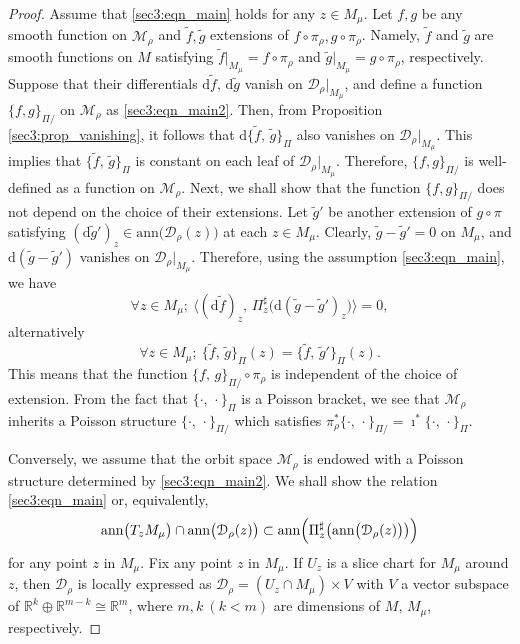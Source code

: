 \documentclass[a4paper,11pt,dvipdfmx]{article}
\numberwithin{equation}{section}
\begin{document}
\begin{proof}
Assume that \eqref{sec3:eqn_main} holds for any $z\in M_{\mu}$. Let $f,g$ be any smooth function on $\mathcal{M}_{\rho}$ 
and $\tilde{f}, \tilde{g}$ extensions of $f\circ\pi_{\rho}, g\circ\pi_{\rho}$. 
Namely, $\tilde{f}$ and $\tilde{g}$ are smooth functions on $M$ satisfying $\tilde{f}|_{M_{\mu}}=f\circ\pi_{\rho}$ and $\tilde{g}|_{M_{\mu}}=g\circ\pi_{\rho}$, respectively. 
Suppose that their differentials $\mathrm{d}\tilde{f},\,\mathrm{d}\tilde{g}$ vanish on $\mathcal{D}_{\rho}|_{M_{\mu}}$, and 
define a function $\{f,g\}_{\Pi/}$ on $\mathcal{M}_{\rho}$ as \eqref{sec3:eqn_main2}. 
Then, from Proposition \ref{sec3:prop_vanishing}, it follows that $\mathrm{d}\{\tilde{f},\,\tilde{g}\}_{\Pi}$ also vanishes on $\mathcal{D}_{\rho}|_{M_{\mu}}$. 
This implies that $\{\tilde{f},\,\tilde{g}\}_{\Pi}$ is constant on each leaf of $\mathcal{D}_{\rho}|_{M_{\mu}}$. Therefore, $\{f,g\}_{\Pi/}$ is well-defined as a function on $\mathcal{M}_{\rho}$. 
Next, we shall show that the function $\{f,g\}_{\Pi/}$ does not depend on the choice of their extensions. 
Let $\tilde{g}'$ be another extension of $g\circ\pi$ satisfying $(\mathrm{d}\tilde{g}')_z\in \mathrm{ann}\bigl(\mathcal{D}_{\rho}(z)\bigr)$ at each $z\in M_{\mu}$. 
Clearly, $\tilde{g}-\tilde{g}'=0$ on $M_{\mu}$, and $\mathrm{d}(\tilde{g}-\tilde{g}')$ vanishes on $\mathcal{D}_{\rho}|_{M_{\mu}}$. 
Therefore, using the assumption \eqref{sec3:eqn_main}, we have 
\[
\forall z\in M_{\mu};\ \bigl\langle (\mathrm{d}\tilde{f})_z,\, \Pi^{\sharp}_z\bigl(\mathrm{d}(\tilde{g}-\tilde{g}')_z\bigr)\bigr\rangle = 0, 
\]
alternatively 
\[
\forall z\in M_{\mu};\ \{\tilde{f},\,\tilde{g}\}_{\Pi}(z) = \{\tilde{f},\,\tilde{g}'\}_{\Pi}(z). 
\]
This means that the function $\{f,\,g\}_{\Pi/}\circ\pi_{\rho}$ is independent of the choice of extension. From the fact that $\{\cdot,\,\cdot\}_{\Pi}$ is a Poisson bracket, 
we see that $\mathcal{M}_{\rho}$ inherits a Poisson structure $\{\cdot,\,\cdot\}_{\Pi/}$ which satisfies $\pi_{\rho}^*\{\cdot,\,\cdot\}_{\Pi/}=\imath^*\{\cdot,\,\cdot\}_{\Pi}$. 

Conversely, we assume that the orbit space $\mathcal{M}_{\rho}$ is endowed with a Poisson structure determined by \eqref{sec3:eqn_main2}. 
We shall show the relation \eqref{sec3:eqn_main} or, equivalently, 
\begin{equation}\label{sec3:eqn_proof}
\mathrm{ann}\bigl(T_zM_{\mu}\bigr) \cap \mathrm{ann}\bigl(\mathcal{D}_{\rho}(z)\bigr)\subset \mathrm{ann}\Bigl(\Pi_z^{\sharp}\bigl(\mathrm{ann}\bigl(\mathcal{D}_{\rho}(z)\bigr)\bigr)\Bigr) 
\end{equation}
for any point $z$ in $M_{\mu}$. Fix any point $z$ in $M_{\mu}$. 
If $U_z$ is a slice chart for $M_{\mu}$ around $z$, then $\mathcal{D}_{\rho}$ is locally expressed as $\mathcal{D}_{\rho}=(U_z\cap M_{\mu})\times V$ with $V$ a vector subspace of 
$\mathbb{R}^k\oplus\mathbb{R}^{m-k}\cong \mathbb{R}^m$, where $m, k~(k<m)$ are dimensions of $M,\,M_{\mu}$, respectively. 


\end{proof}
\end{document}
